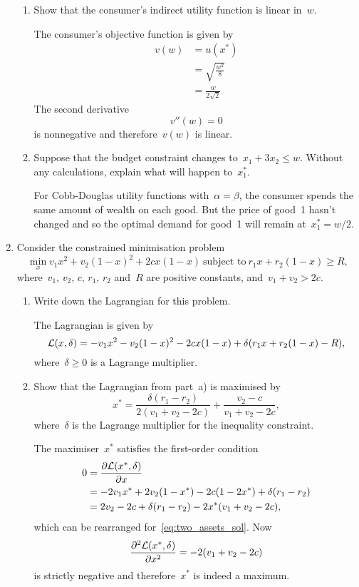 \begin{enumerate}
\begin{enumerate}
		\item
		Show that the consumer's indirect utility function is linear in~$w$.
		\begin{solution}
			The consumer's objective function is given by
			\begin{align}
				v(w)
				&= u(x^*)\\
				&= \sqrt{\frac{w^2}{8}}\\
				&= \frac{w}{2\sqrt{2}}
			\end{align}
			The second derivative
			\[ v''(w)=0 \]
			is nonnegative and therefore~$v(w)$ is linear.
		\end{solution}

		\item
		Suppose that the budget constraint changes to~$x_1+3x_2\le w$.
		Without any calculations, explain what will happen to~$x_1^*$.
		\begin{solution}
			For Cobb-Douglas utility functions with~$\alpha=\beta$, the consumer spends the same amount of wealth on each good.
			But the price of good~1 hasn't changed and so the optimal demand for good~1 will remain at~$x_1^*=w/2$.
		\end{solution}

	\end{enumerate}

	\item
	Consider the constrained minimisation problem
	\[ \min_x v_1x^2+v_2(1-x)^2+2cx(1-x)\ \text{subject to}\ r_1x+r_2(1-x)\ge R, \]
	where~$v_1$, $v_2$, $c$, $r_1$, $r_2$ and~$R$ are positive constants, and~$v_1+v_2>2c$.
	\begin{enumerate}

		\item
		Write down the Lagrangian for this problem.
		\begin{solution}
			The Lagrangian is given by
			\[ \Lcal(x,\delta)%
				=-v_1x^2-v_2(1-x)^2-2cx(1-x)%
				+\delta(r_1x+r_2(1-x)-R), \]
			where~$\delta\ge0$ is a Lagrange multiplier.
		\end{solution}

		\item
		Show that the Lagrangian from part~a) is maximised by
		\[ x^*%
			=\frac{\delta(r_1-r_2)}{2(v_1+v_2-2c)}%
			+\frac{v_2-c}{v_1+v_2-2c}, \label{eq:two_assets_sol} \]
		where~$\delta$ is the Lagrange multiplier for the inequality constraint.
		\begin{solution}
			The maximiser~$x^*$ satisfies the first-order condition
			\begin{align}
				0
				&= \frac{\partial\mathcal{L}(x^*,\delta)}{\partial x}\\
				&= -2v_1x^*+2v_2(1-x^*)-2c(1-2x^*)+\delta(r_1-r_2)\\
				&= 2v_2-2c+\delta(r_1-r_2)-2x^*(v_1+v_2-2c),
			\end{align}
			which can be rearranged for~\eqref{eq:two_assets_sol}.
			Now
			\[ \frac{\partial^2\mathcal{L}(x^*,\delta)}{\partial x^2}=-2(v_1+v_2-2c) \]
			is strictly negative and therefore~$x^*$ is indeed a maximum.


\end{solution}
\end{enumerate}
\end{enumerate}
